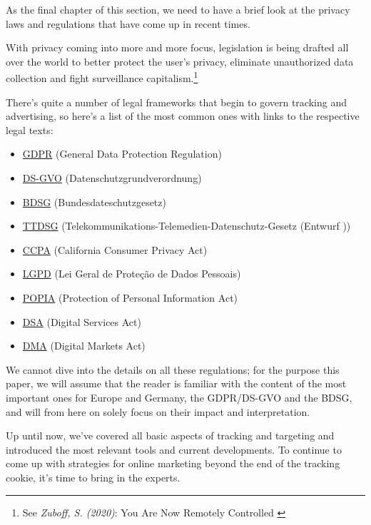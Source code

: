 As the final chapter of this section, we need to have a brief look at the privacy laws and regulations that have come up in recent times. 

With privacy coming into more and more focus, legislation is being drafted all over the world to better protect the user's privacy, eliminate unauthorized data collection and fight surveillance capitalism.\footnote{See \textit{Zuboff, S. (2020)}: You Are Now Remotely Controlled \cite{surveillance}} 

There's quite a number of legal frameworks that begin to govern tracking and advertising, so here's a list of the most common ones with links to the respective legal texts:

\begin{itemize}
 \item \href{https://gdpr-info.eu/}{GDPR} (General Data Protection Regulation)
 \item \href{https://www.datenschutz-grundverordnung.eu/}{DS-GVO} (Datenschutzgrundverordnung)
 \item \href{https://dsgvo-gesetz.de/bdsg/}{BDSG} (Bundesdateschutzgesetz)
 \item \href{https://dsgvo-gesetz.de/ttdsg/}{TTDSG} (Telekommunikations-Telemedien-Datenschutz-Gesetz (Entwurf ))
 \item \href{https://oag.ca.gov/privacy/ccpa}{CCPA} (California Consumer Privacy Act)
 \item \href{https://www.lgpdbrasil.com.br/}{LGPD} (Lei Geral de Proteção de Dados Pessoais)
 \item \href{https://popia.co.za/}{POPIA} (Protection of Personal Information Act)
 \item \href{https://ec.europa.eu/info/strategy/priorities-2019-2024/europe-fit-digital-age/digital-services-act-ensuring-safe-and-accountable-online-environment_en}{DSA} (Digital Services Act)
 \item \href{https://ec.europa.eu/info/strategy/priorities-2019-2024/europe-fit-digital-age/digital-markets-act-ensuring-fair-and-open-digital-markets_en}{DMA} (Digital Markets Act)
\end{itemize}

We cannot dive into the details on all these regulations; for the purpose this paper, we will assume that the reader is familiar with the content of the most important ones for Europe and Germany, the GDPR/DS-GVO and the BDSG, and will from here on solely focus on their impact and interpretation.

Up until now, we've covered all basic aspects of tracking and targeting and introduced the most relevant tools and current developments. To continue to come up with strategies for online marketing beyond the end of the tracking cookie, it's time to bring in the experts.

